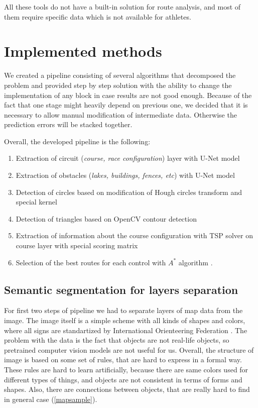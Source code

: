 \documentclass[a4paper,12pt]{extarticle}
\begin{document}
All these tools do not have a built-in solution for route analysis, and most of them require specific data which is not available for athletes.

\section{Implemented methods}

We created a pipeline consisting of several algorithms that decomposed the problem and provided step by step solution with the ability to change the implementation of any block in case results are not good enough.
Because of the fact that one stage might heavily depend on previous one, we decided that it is necessary to allow manual modification of intermediate data.
Otherwise the prediction errors will be stacked together.


Overall, the developed pipeline is the following:
\begin{enumerate}
\item Extraction of circuit (\textit{course, race configuration}) layer with U-Net model \cite{unet}
\item Extraction of obstacles (\textit{lakes, buildings, fences, etc}) with U-Net model \cite{unet}
\item Detection of circles based on modification of Hough circles transform \cite{houghcircles} and special kernel 
\item Detection of triangles based on OpenCV contour detection \cite{findcontours}
\item Extraction of information about the course configuration with TSP solver \cite{tspsolver} on course layer with special scoring matrix
\item Selection of the best routes for each control with $A^*$ algorithm \cite{astar}.
\end{enumerate}


\subsection{Semantic segmentation for layers separation}

For first two steps of pipeline we had to separate layers of map data from the image.
The image itself is a simple scheme with all kinds of shapes and colors, where all signs are standartized by International Orienteering Federation \cite{iof}.
The problem with the data is the fact that objects are not real-life objects, so pretrained computer vision models are not useful for us.
Overall, the structure of image is based on some set of rules, that are hard to express in a formal way.
These rules are hard to learn artificially, because there are same colors used for different types of things, and objects are not consistent in terms of forms and shapes.
Also, there are connections between objects, that are really hard to find in general case (\cref{mapsample}).
\end{document}
